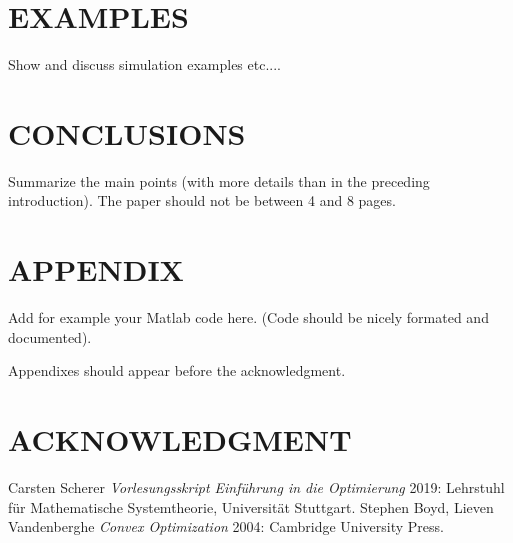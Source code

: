 \documentclass[letterpaper, 10 pt, conference]{ieeeconf}  %
\begin{document}
\section{EXAMPLES}

Show and discuss simulation examples etc....



\section{CONCLUSIONS}

Summarize the main points (with more details than in the preceding introduction).
The paper should not be between 4 and 8 pages.



\addtolength{\textheight}{-12cm}   %



\section*{APPENDIX}

Add for example your Matlab code here. (Code should be nicely formated and documented).

Appendixes should appear before the acknowledgment.

\section*{ACKNOWLEDGMENT}



%
%

\begin{thebibliography}{99}
	   Carsten Scherer {\em Vorlesungsskript Einführung in die Optimierung} 2019: Lehrstuhl für Mathematische Systemtheorie, Universität Stuttgart.
	   Stephen Boyd, Lieven Vandenberghe {\em Convex Optimization} 2004: Cambridge University Press.
\end{thebibliography}
\end{document}
